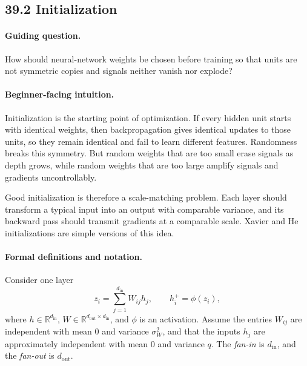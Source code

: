 \subsection{39.2 Initialization}

\paragraph{Guiding question.}
How should neural-network weights be chosen before training so that units are not symmetric copies and signals neither vanish nor explode?

\paragraph{Beginner-facing intuition.}
Initialization is the starting point of optimization. If every hidden unit starts with identical weights, then backpropagation gives identical updates to those units, so they remain identical and fail to learn different features. Randomness breaks this symmetry. But random weights that are too small erase signals as depth grows, while random weights that are too large amplify signals and gradients uncontrollably.

Good initialization is therefore a scale-matching problem. Each layer should transform a typical input into an output with comparable variance, and its backward pass should transmit gradients at a comparable scale. Xavier and He initializations are simple versions of this idea.

\paragraph{Formal definitions and notation.}
Consider one layer
\[
z_i=\sum_{j=1}^{d_{\mathrm{in}}}W_{ij}h_j,\qquad
h_i^+=\phi(z_i),
\]
where \(h\in\mathbb{R}^{d_{\mathrm{in}}}\), \(W\in\mathbb{R}^{d_{\mathrm{out}}\times d_{\mathrm{in}}}\), and \(\phi\) is an activation. Assume the entries \(W_{ij}\) are independent with mean \(0\) and variance \(\sigma_W^2\), and that the inputs \(h_j\) are approximately independent with mean \(0\) and variance \(q\). The \emph{fan-in} is \(d_{\mathrm{in}}\), and the \emph{fan-out} is \(d_{\mathrm{out}}\).

